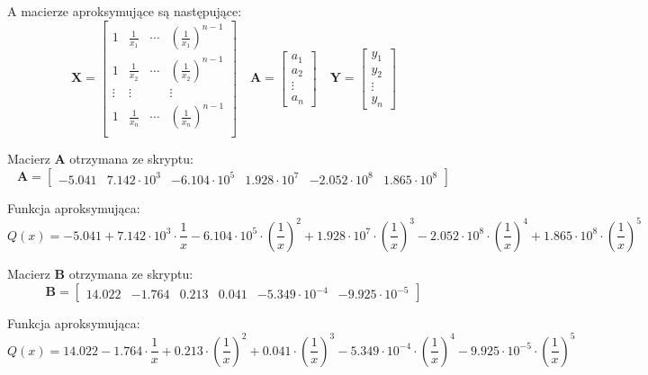 \documentclass[a4paper, 12pt]{mwart}
\begin{document}
				A macierze aproksymujące są następujące:
				$$\textbf{X} = \begin{bmatrix}
					1     & \frac{1}{x_1} & \cdots & \left(\frac{1}{x_1}\right)^{n-1}\\
					1     & \frac{1}{x_2} & \cdots & \left(\frac{1}{x_2}\right)^{n-1}\\
					\vdots& \vdots        &        & \vdots\\
					1     & \frac{1}{x_n} & \cdots & \left(\frac{1}{x_n}\right)^{n-1}\\
				\end{bmatrix}
				\quad 
				\textbf{A} = \begin{bmatrix}
					a_1\\
					a_2\\
					\vdots\\
					a_n
				\end{bmatrix} \quad
				\textbf{Y} = \begin{bmatrix}
					y_1\\
					y_2\\
					\vdots\\
					y_n
				\end{bmatrix}$$

				Macierz $\textbf{A}$ otrzymana ze skryptu:
				$$\textbf{A} = \begin{bmatrix}
					-5.041 &
					7.142 \cdot 10^3 &
					-6.104 \cdot 10^5 &
					1.928 \cdot 10^7 &
					-2.052 \cdot 10^8 &
					1.865 \cdot 10^8
				\end{bmatrix}$$

				Funkcja aproksymująca:
				$$Q(x) = -5.041  + 7.142 \cdot 10^3 \cdot \frac{1}{x} -6.104 \cdot 10^5 \cdot
				\left(\frac{1}{x}\right)^2 +1.928 \cdot 10^7 \cdot \left(\frac{1}{x}\right)^3
				-2.052 \cdot 10^8 \cdot \left(\frac{1}{x}\right)^4 + 1.865 \cdot 10^8 \cdot \left(
				\frac{1}{x}\right)^5$$

				Macierz $\textbf{B}$ otrzymana ze skryptu:
				$$\textbf{B} = \begin{bmatrix}
					14.022 &
					-1.764 &
					0.213 &
					0.041 &
					-5.349 \cdot 10^{-4} &
					-9.925 \cdot 10^{-5}
				\end{bmatrix}$$
				
				Funkcja aproksymująca:
				$$Q(x) = 14.022
				-1.764\cdot \frac{1}{x} 
				+ 0.213\cdot \left(\frac{1}{x}\right)^2 
				+ 0.041\cdot \left(\frac{1}{x}\right)^3 
				-5.349\cdot 10^{-4}\cdot \left(\frac{1}{x}\right)^4   
				-9.925 \cdot 10^{-5}\cdot \left(\frac{1}{x}\right)^5$$
\end{document}
